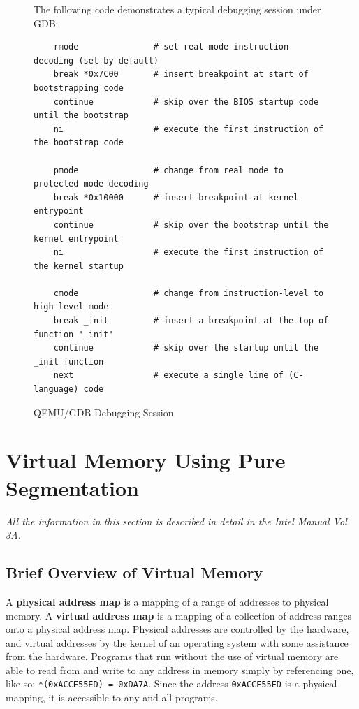 \documentclass[titlepage]{article}
\begin{document}
\begin{figure}[!ht]
The following code demonstrates a typical debugging session under GDB:
\begin{verbatim}
    rmode               # set real mode instruction decoding (set by default)
    break *0x7C00       # insert breakpoint at start of bootstrapping code
    continue            # skip over the BIOS startup code until the bootstrap
    ni                  # execute the first instruction of the bootstrap code

    pmode               # change from real mode to protected mode decoding
    break *0x10000      # insert breakpoint at kernel entrypoint
    continue            # skip over the bootstrap until the kernel entrypoint
    ni                  # execute the first instruction of the kernel startup

    cmode               # change from instruction-level to high-level mode
    break _init         # insert a breakpoint at the top of function '_init'
    continue            # skip over the startup until the _init function
    next                # execute a single line of (C-language) code
\end{verbatim}
\caption{QEMU/GDB Debugging Session}
\end{figure}

%
%

\section{Virtual Memory Using Pure Segmentation}

\textit{All the information in this section is described in detail in the Intel
Manual Vol 3A.}

\subsection{Brief Overview of Virtual Memory}
A \textbf{physical address map} is a mapping of a range of addresses to physical
memory.  A \textbf{virtual address map} is a mapping of a collection of address
ranges onto a physical address map. Physical addresses are controlled by the
hardware, and virtual addresses by the kernel of an operating system with some
assistance from the hardware. Programs that run without the use of virtual
memory are able to read from and write to any address in memory simply by
referencing one, like so: \verb|*(0xACCE55ED) = 0xDA7A|. Since the address
\verb|0xACCE55ED| is a physical mapping, it is accessible to any and all
programs.
\end{document}
